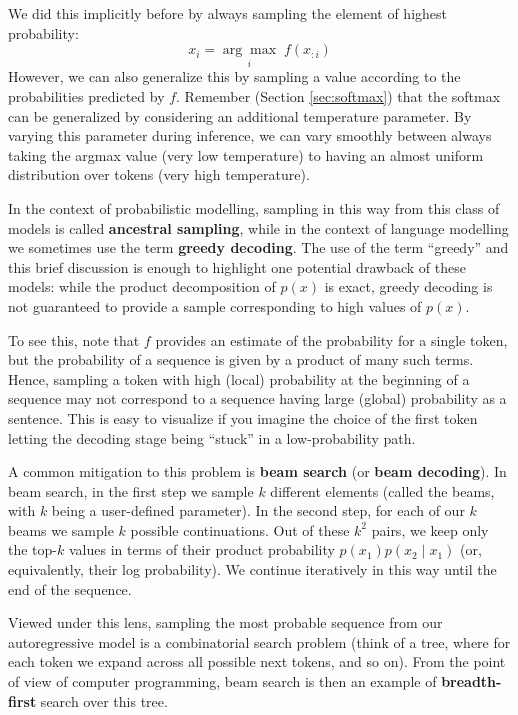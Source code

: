 We did this implicitly before by always sampling the element of highest probability:
%
$$
x_i=\underset{i}{\arg\max} \;f(x_{:i})
$$
%
However, we can also generalize this by sampling a value according to the probabilities predicted by $f$. Remember (Section \ref{sec:softmax}) that the softmax can be generalized by considering an additional temperature parameter. By varying this parameter during inference, we can vary smoothly between always taking the argmax value (very low temperature) to having an almost uniform distribution over tokens (very high temperature).

In the context of probabilistic modelling, sampling in this way from this class of models is called \textbf{ancestral sampling}, while in the context of language modelling we sometimes use the term \textbf{greedy decoding}. The use of the term “greedy” and this brief discussion is enough to highlight one potential drawback of these models: while the product decomposition of $p(x)$ is exact, greedy decoding is not guaranteed to provide a sample corresponding to high values of $p(x)$. 

To see this, note that $f$ provides an estimate of the probability for a single token, but the probability of a sequence is given by a product of many such terms. Hence, sampling a token with high (local) probability at the beginning of a sequence may not correspond to a sequence having large (global) probability as a sentence. This is easy to visualize if you imagine the choice of the first token letting the decoding stage being “stuck” in a low-probability path.

A common mitigation to this problem is \textbf{beam search} (or \textbf{beam decoding}). In beam search, in the first step we sample $k$ different elements (called the beams, with $k$ being a user-defined parameter). In the second step, for each of our $k$ beams we sample $k$ possible continuations. Out of these $k^2$ pairs, we keep only the top-$k$ values in terms of their product probability $p(x_1)p(x_2\mid x_1)$ (or, equivalently, their log probability). We continue iteratively in this way until the end of the sequence.

Viewed under this lens, sampling the most probable sequence from our autoregressive model is a combinatorial search problem (think of a tree, where for each token we expand across all possible next tokens, and so on). From the point of view of computer programming, beam search is then an example of \textbf{breadth-first} search over this tree.

